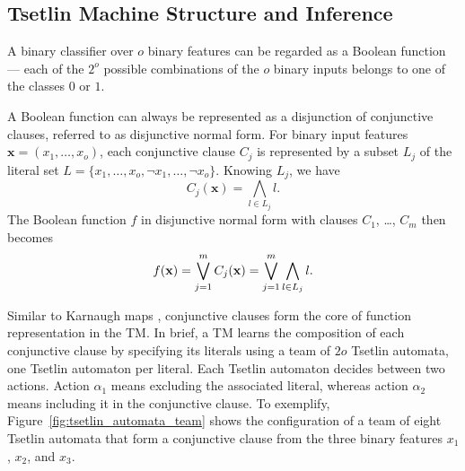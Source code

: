 \documentclass[letterpaper]{article}
\begin{document}
\subsection{Tsetlin Machine Structure and Inference}
A binary classifier over $o$ binary features can be regarded as a Boolean function --- each of the $2^o$ possible combinations of the $o$ binary inputs belongs to one of the classes $0$ or $1$.

A Boolean function can always be represented as a disjunction of conjunctive clauses, referred to as disjunctive normal form. For binary input features $\mathbf x=(x_1,\ldots,x_o)$, each conjunctive clause $C_j$ is represented by a subset $L_j$ of the literal set $L=\{x_1, \ldots, x_o,\lnot x_1, \ldots, \lnot x_o\}$. Knowing $L_j$, we have
\begin{equation}
C_j(\mathbf x)=\bigwedge_{l\in L_j}l.
\end{equation}
The Boolean function $f$ in disjunctive normal form with clauses $C_1$, \ldots, $C_m$ then becomes
\begin{align}
f(\mathbf x)=\bigvee_{\vphantom{l}j=1}^m C_j(\mathbf x)=\bigvee_{\vphantom{l}j=1}^m\bigwedge_{l\in L_j}l.
\end{align}

Similar to Karnaugh maps \cite{karnaugh1953map}, conjunctive clauses form the core of function representation in the TM. In brief, a TM learns the composition of each conjunctive clause by specifying its literals using a team of $2o$ Tsetlin automata, one Tsetlin automaton per literal. Each Tsetlin automaton decides between two actions. Action $\alpha_1$ means excluding the associated literal, whereas action $\alpha_2$ means including it in the conjunctive clause. To exemplify, Figure~\ref{fig:tsetlin_automata_team} shows the configuration of a team of eight Tsetlin automata that form a conjunctive clause from the three binary features $x_1$, $x_2$, and $x_3$.
\end{document}
